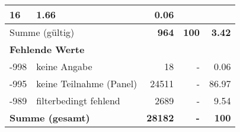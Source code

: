 \begin{longtable}{lXrrr}
       \num{16} &
       \num[round-mode=places,round-precision=2]{1,66} &
         \num[round-mode=places,round-precision=2]{0,06} \\
     \midrule
     \multicolumn{2}{l}{Summe (gültig)} &
       \textbf{\num{964}} &
     \textbf{100} &
       \textbf{\num[round-mode=places,round-precision=2]{3,42}} \\
     \multicolumn{5}{l}{\textbf{Fehlende Werte}}\\
       -998 &
       keine Angabe &
         \num{18} &
        - &
         \num[round-mode=places,round-precision=2]{0,06} \\
       -995 &
       keine Teilnahme (Panel) &
         \num{24511} &
        - &
         \num[round-mode=places,round-precision=2]{86,97} \\
       -989 &
       filterbedingt fehlend &
         \num{2689} &
        - &
         \num[round-mode=places,round-precision=2]{9,54} \\
     \midrule
     \multicolumn{2}{l}{\textbf{Summe (gesamt)}} &
          \textbf{\num{28182}} &
        \textbf{-} &
        \textbf{100} \\
     \bottomrule
     \end{longtable}
     

